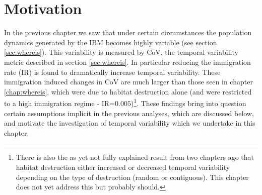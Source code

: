 
\section{Motivation}
\label{sec:motivate_stationarity}

In the previous chapter we saw that under certain circumstances the population dynamics generated by the IBM becomes highly variable (see section \ref{sec:whereis}). This variability is measured by CoV, the temporal variability metric described in section \ref{sec:whereis}. In particular reducing the immigration rate (IR) is found to dramatically increase temporal variability. These immigration induced changes in CoV are much larger than those seen in chapter \ref{chap:whereis}, which were due to habitat destruction alone (and were restricted to a high immigration regime - IR=$0.005$)\footnote{There is also the as yet not fully explained result from two chapters ago that habitat destruction either increased or decreased temporal variability depending on the type of destruction (random or contiguous). This chapter does not yet address this but probably should.}. These findings bring into question certain assumptions implicit in the previous analyses, which are discussed below, and motivate the investigation of temporal variability which we undertake in this chapter. 

